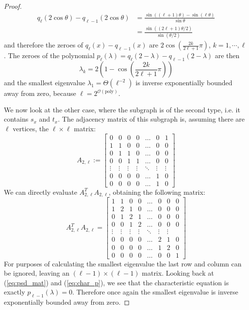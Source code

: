 \documentclass[11pt]{article}
\theoremstyle{definition}
\theoremstyle{remark}
\newcommand{\poly}{\mathrm{poly}}
\begin{document}
\begin{proof}
\begin{align}
q_\ell(2\cos\theta) - q_{\ell-1}(2\cos\theta) &= \frac{\sin((\ell+1)\theta) - \sin(\ell \theta)}{\sin\theta} \\
&= \frac{\sin((2\ell+1)\theta/2)}{\sin (\theta/2)}
\end{align}
and therefore the zeroes of $q_\ell(x) - q_{\ell-1}(x)$ are $2\cos\left(\frac{2k}{2\ell + 1}\pi\right)$, $k = 1,\cdots,\ell$. The zeroes of the polynomial $p_\ell(\lambda) = q_\ell(2-\lambda) - q_{\ell-1}(2-\lambda)$ are then
\begin{equation}
\lambda_k = 2\left(1 - \cos\left(\frac{2k}{2\ell+1}\pi\right)\right)
\end{equation}
and the smallest eigenvalue $\lambda_1 = \Theta(\ell^{-2})$ is inverse exponentially bounded away from zero, because $\ell = 2^{\mathcal{O}(\poly)}$.

We now look at the other case, where the subgraph is of the second type, i.e. it contains $s_x$ and $t_x$. The adjacency matrix of this subgraph is, assuming there are $\ell$ vertices, the $\ell \times \ell $ matrix:
\begin{equation}
A_{2,\ell} := 
\begin{bmatrix}
    0 & 0 & 0 & 0 & \dots  & 0  & 1 \\
    1 & 1 & 0 & 0 &\dots  & 0 & 0 \\
    0 & 1 & 1 & 0 & \dots  & 0 & 0 \\
     0 & 0 & 1 & 1 & \dots  & 0 & 0 \\
    \vdots & \vdots & \vdots & \vdots & \ddots & \vdots & \vdots \\
    0 & 0 & 0 & 0 & \dots  & 1 & 0 \\
    0 & 0 & 0 & 0 & \dots  & 1 & 0
\end{bmatrix}
\end{equation}
We can directly evaluate $A_{2,\ell}^T A_{2,\ell}$, obtaining the following matrix:
\begin{equation}
A_{2,\ell}^T A_{2,\ell} = 
\begin{bmatrix}
    1 & 1 & 0 & 0 & \dots  & 0 & 0  & 0 \\
    1 & 2 & 1 & 0 &\dots  & 0 & 0 & 0 \\
    0 & 1 & 2 & 1 & \dots  & 0 & 0 & 0 \\
     0 & 0 & 1 & 2 & \dots  & 0 & 0 & 0 \\
    \vdots & \vdots & \vdots & \vdots & \ddots & \vdots & \vdots \\
    0 & 0 & 0 & 0 & \dots  & 2 & 1 & 0 \\
    0 & 0 & 0 & 0 & \dots  & 1 & 2 & 0 \\
    0 & 0 & 0 & 0 & \dots  & 0 & 0 & 1
\end{bmatrix}
\end{equation}
For purposes of calculating the smallest eigenvalue the last row and column can be ignored, leaving an $(\ell-1) \times (\ell-1)$ matrix. Looking back at (\ref{eq:psd_mat}) and (\ref{eq:char_p}), we see that the characteristic equation is exactly $p_{\ell-1}(\lambda) = 0$. Therefore once again the smallest eigenvalue is inverse exponentially bounded away from zero.

\end{proof}
\end{document}
